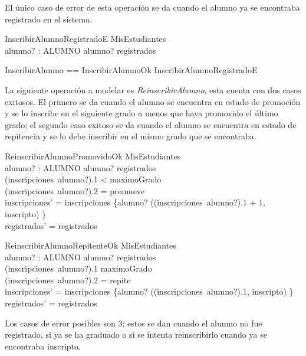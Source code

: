 \documentclass{article}
\begin{document}
El único caso de error de esta operación se da cuando el alumno ya se encontraba registrado en el sistema.
\begin{schema}{InscribirAlumnoRegistradoE}
    \Xi MisEstudiantes \\
    alumno? : ALUMNO
    \where
    alumno? \in registrados
\end{schema}

\begin{zed}
    InscribirAlumno == InscribirAlumnoOk \lor InscribirAlumnoRegistradoE
\end{zed}

La siguiente operación a modelar es \emph{ReinscribirAlumno}, esta cuenta con dos casos exitosos. El primero se da cuando el alumno se encuentra en estado de promoción y se lo inscribe en el siguiente grado a menos que haya promovido el último grado; el segundo caso exitoso se da cuando el alumno se encuentra en estado de repitencia y se lo debe inscribir en el mismo grado que se encontraba.
\begin{schema}{ReinscribirAlumnoPromovidoOk}
    \Delta MisEstudiantes \\
    alumno? : ALUMNO
    \where
    alumno? \in registrados \\
    (inscripciones~alumno?).1 < maximoGrado \\ 
    (inscripciones~alumno?).2 = promueve \\
    inscripciones' = inscripciones \oplus \{alumno? \mapsto ((inscripciones~alumno?).1 + 1, inscripto) \} \\
    registrados' = registrados
\end{schema}

\begin{schema}{ReinscribirAlumnoRepitenteOk}
    \Delta MisEstudiantes \\
    alumno? : ALUMNO
    \where
    alumno? \in registrados \\
    (inscripciones~alumno?).1 \leq maximoGrado \\ 
    (inscripciones~alumno?).2 = repite \\
    inscripciones' = inscripciones \oplus \{alumno? \mapsto ((inscripciones~alumno?).1, inscripto) \} \\
    registrados' = registrados
\end{schema}

Los casos de error posibles son 3: estos se dan cuando el alumno no fue registrado, si ya se ha graduado o si se intenta reinscribirlo cuando ya se encontraba inscripto.
\end{document}
